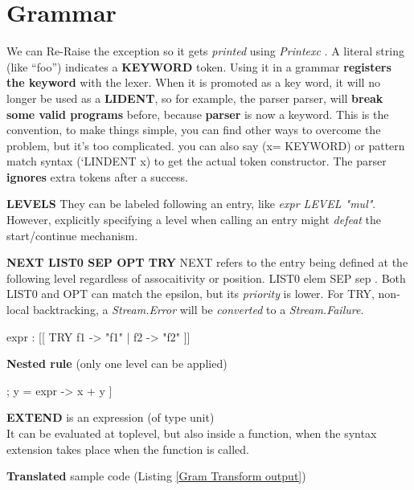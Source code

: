 \section{Grammar}

We can Re-Raise the exception so it gets \textit{printed} using
\textit{Printexc} .  A literal string (like ``foo'') indicates a
\textbf{KEYWORD} token. Using it in a grammar \textbf{registers the
  keyword} with the lexer. When it is promoted as a key word, it will
no longer be used as a \textbf{LIDENT}, so for example, the parser
parser, will \textbf{break some valid programs} before, because
\textbf{parser} is now a keyword. This is the convention, to make
things simple, you can find other ways to overcome the problem, but
it's too complicated. you can also say (x= KEYWORD) or pattern match
syntax (`LINDENT x) to get the actual token constructor. The parser
\textbf{ignores} extra tokens after a success.


\textbf{LEVELS}  They can be labeled following an entry, like \textit{expr
  LEVEL "mul"}. However, explicitly specifying a level when calling an
entry might \textit{defeat} the start/continue mechanism.

\textbf{NEXT LIST0 SEP OPT TRY} NEXT refers to the entry being defined
at the following level regardless of assocaitivity or position.  LIST0
elem SEP sep .  Both LIST0 and OPT can match the epsilon, but its
\textit{priority} is lower.  For TRY, non-local backtracking, a
\textit{Stream.Error} will be \textit{converted} to a \textit{Stream.Failure}.


  \begin{ocamlcode}
    expr : [[ TRY f1 -> "f1" | f2 -> "f2" ]]
  \end{ocamlcode}
  
  \textbf{Nested rule} (only one level  can be applied)
  
  \begin{ocamlcode}
    [x = expr ; ["+" | "plus" ]; y = expr -> x + y ]
  \end{ocamlcode}
  
  \textbf{EXTEND} is an expression (of type unit) \\
  It can be evaluated at toplevel, but also inside a function, when
  the syntax extension takes place when the function is called.

  \textbf{Translated} sample code (Listing \ref{Gram Transform
    output})

  \inputminted[fontsize=\scriptsize]{ocaml}{code/camlp4/extend_trans/first.ml}
  
